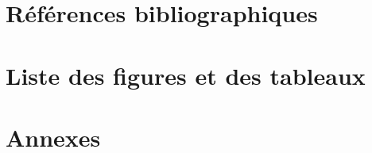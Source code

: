 \part{Références bibliographiques}
\nocite{*}

\part{Liste des figures et des tableaux}
\part{Annexes}
